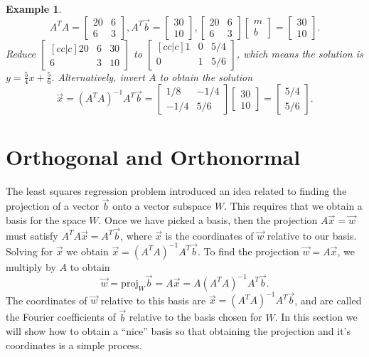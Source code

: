 \documentclass[10pt]{article}
\theoremstyle{plain}
\theoremstyle{box}
\newtheorem{example}{Example}
\begin{document}
\begin{example}
$$A^T A = \begin{bmatrix}20&6\\6&3\end{bmatrix}, 
A^T\vec b = \begin{bmatrix}30\\10\end{bmatrix}, \begin{bmatrix}20&6\\6&3\end{bmatrix} \begin{bmatrix}m\\b\end{bmatrix}=\begin{bmatrix}30\\10\end{bmatrix}.$$ 
Reduce $\begin{bmatrix}[cc|c]20&6&30\\6&3&10\end{bmatrix}$ to $\begin{bmatrix}[cc|c]1&0&5/4\\0&1&5/6\end{bmatrix}$, which means the solution is $y=\frac{5}{4}x+\frac{5}{6}.$  Alternatively, invert $A$ to obtain the solution $$\vec x = (A^T A)^{-1}A^T \vec b = \begin{bmatrix}1/8&-1/4\\-1/4&5/6\end{bmatrix}\begin{bmatrix}30\\10\end{bmatrix} = \begin{bmatrix}5/4\\5/6\end{bmatrix}.$$  

\end{example} 







\section{Orthogonal and Orthonormal}
The least squares regression problem introduced an idea related to finding the projection of a vector $\vec b$ onto a vector subspace $W$.  This requires that we obtain a basis for the space $W$. Once we have picked a basis, then the projection $A\vec x=\vec w$ must satisfy $A^TA\vec x = A^T\vec b$, where $\vec x$ is the coordinates of $\vec w$ relative to our basis. Solving for $\vec x$ we obtain $\vec x = (A^T A)^{-1}A^T \vec b$. To find the projection $\vec w = A\vec x$, we multiply by $A$ to obtain $$\vec w = \text{proj}_W \vec b =  A\vec x = A(A^T A)^{-1}A^T \vec b.$$ The coordinates of $\vec w$ relative to this basis are $\vec x = (A^T A)^{-1}A^T \vec b$, and are called the Fourier coefficients of $\vec b$ relative to the basis chosen for $W$.
In this section we will show how to obtain a ``nice'' basis so that obtaining the projection and it's coordinates is a simple process.  
\end{document}
